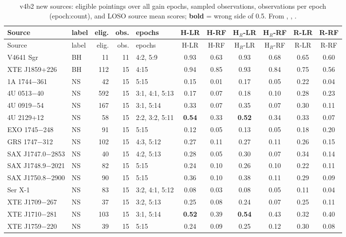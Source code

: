 \FloatBarrier %
{\footnotesize\setlength{\tabcolsep}{3.5pt}
\begin{longtable}{@{}llrrlcccccc@{}}
\caption[v4b2 new sources]{v4b2 new sources: eligible pointings over all gain epochs, sampled observations, observations
per epoch (epoch:count), and LOSO source mean scores; \textbf{bold} = wrong side of 0.5. From
, , .}\label{tab:p2v4b2new}\\
\toprule
Source & label & elig. & obs. & epochs & H-LR & H-RF & H$_R$-LR & H$_R$-RF & R-LR & R-RF \\
\midrule\endfirsthead
\toprule Source & label & elig. & obs. & epochs & H-LR & H-RF & H$_R$-LR & H$_R$-RF & R-LR & R-RF \\ \midrule\endhead
\bottomrule\endfoot
V4641 Sgr & BH & 11 & 11 & 4:2, 5:9 & 0.93 & 0.63 & 0.93 & 0.68 & 0.65 & 0.60 \\
XTE J1859+226 & BH & 112 & 15 & 4:15 & 0.94 & 0.85 & 0.93 & 0.84 & 0.75 & 0.56 \\
1A 1744$-$361 & NS & 42 & 15 & 5:15 & 0.15 & 0.01 & 0.17 & 0.05 & 0.22 & 0.04 \\
4U 0513$-$40 & NS & 592 & 15 & 3:1, 4:1, 5:13 & 0.17 & 0.07 & 0.18 & 0.10 & 0.28 & 0.23 \\
4U 0919$-$54 & NS & 167 & 15 & 3:1, 5:14 & 0.33 & 0.07 & 0.35 & 0.07 & 0.30 & 0.11 \\
4U 2129+12 & NS & 58 & 15 & 2:2, 3:2, 5:11 & \textbf{0.54} & 0.33 & \textbf{0.52} & 0.34 & 0.33 & 0.07 \\
EXO 1745$-$248 & NS & 91 & 15 & 5:15 & 0.12 & 0.05 & 0.13 & 0.05 & 0.18 & 0.20 \\
GRS 1747$-$312 & NS & 102 & 15 & 4:3, 5:12 & 0.27 & 0.11 & 0.27 & 0.11 & 0.26 & 0.15 \\
SAX J1747.0$-$2853 & NS & 40 & 15 & 4:2, 5:13 & 0.28 & 0.05 & 0.30 & 0.07 & 0.34 & 0.14 \\
SAX J1748.9$-$2021 & NS & 82 & 15 & 5:15 & 0.24 & 0.10 & 0.26 & 0.10 & 0.22 & 0.11 \\
SAX J1750.8$-$2900 & NS & 90 & 15 & 5:15 & 0.36 & 0.10 & 0.38 & 0.11 & 0.29 & 0.09 \\
Ser X-1 & NS & 83 & 15 & 3:2, 4:1, 5:12 & 0.08 & 0.03 & 0.08 & 0.05 & 0.11 & 0.04 \\
XTE J1709$-$267 & NS & 37 & 15 & 3:2, 5:13 & 0.25 & 0.08 & 0.24 & 0.07 & 0.25 & 0.11 \\
XTE J1710$-$281 & NS & 103 & 15 & 3:1, 5:14 & \textbf{0.52} & 0.39 & \textbf{0.54} & 0.43 & 0.32 & 0.40 \\
XTE J1759$-$220 & NS & 39 & 15 & 5:15 & 0.24 & 0.09 & 0.25 & 0.12 & 0.30 & 0.08 \\
\end{longtable}}

